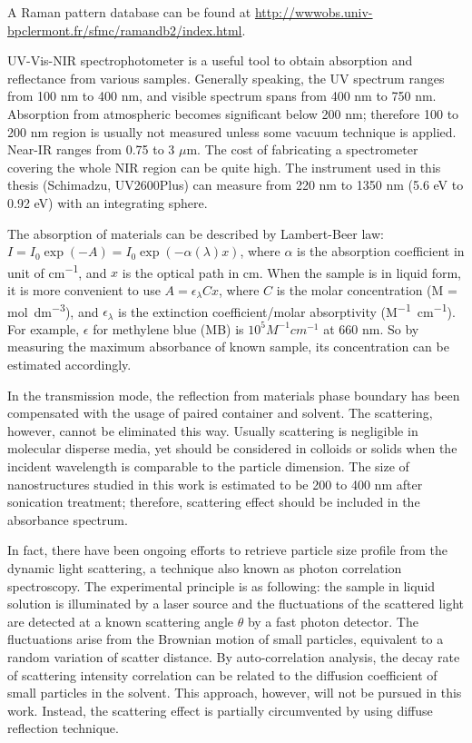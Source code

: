 A Raman pattern database can be found at \url{http://wwwobs.univ-bpclermont.fr/sfmc/ramandb2/index.html}. 

UV-Vis-NIR spectrophotometer is a useful tool to obtain absorption and reflectance from various samples. Generally speaking, the UV spectrum ranges from 100 nm to 400 nm, and visible spectrum spans from 400 nm to 750 nm. Absorption from atmospheric  becomes significant below 200 nm; therefore 100 to 200 nm region is usually not measured unless some vacuum technique is applied. Near-IR ranges from 0.75 to 3 $\mu$m. The cost of fabricating a spectrometer covering the whole NIR region can be quite high. The instrument used in this thesis (Schimadzu, UV2600Plus) can measure from 220 nm to 1350 nm (5.6 eV to 0.92 eV) with an integrating sphere.

The absorption of materials can be described by Lambert-Beer law: $I = I_0 \exp(-A)=I_0\exp(-\alpha(\lambda) x)$, where $\alpha$ is the absorption coefficient in unit of \si{cm^{-1}}, and $x$ is the optical path in cm. When the sample is in liquid form, it is more convenient to use $A =\epsilon_\lambda C x$, where $C$ is the molar concentration (M = \si{\mole dm^{-3}}), and $\epsilon_\lambda$ is the extinction coefficient/molar absorptivity (\si{M^{-1} cm^{-1}}). For example, $\epsilon$ for methylene blue (MB) is $10^5 M^{-1}cm^{-1}$ at 660 nm.\cite{Mills1999} So by measuring the maximum absorbance of known sample, its concentration can be estimated accordingly. 

In the transmission mode, the reflection from materials phase boundary has been compensated with the usage of paired container and solvent. The scattering, however, cannot be eliminated this way. Usually scattering is negligible in molecular disperse media, yet should be considered in colloids or solids when the incident wavelength is comparable to the particle dimension. The size of nanostructures studied in this work is estimated to be 200 to 400 nm after sonication treatment; therefore, scattering effect should be included in the absorbance spectrum. 

In fact, there have been ongoing efforts to retrieve particle size profile from the dynamic light scattering, a technique also known as photon correlation spectroscopy. The experimental principle is as following: the sample in liquid solution is illuminated by a laser source and the fluctuations of the scattered light are detected at a known scattering angle $\theta$ by a fast photon detector. The fluctuations arise from the Brownian motion of small particles, equivalent to a random variation of scatter distance. By auto-correlation analysis, the decay rate of scattering intensity correlation can be related to the diffusion coefficient of small particles in the solvent.\cite{Maret1987} This approach, however, will not be pursued in this work. Instead, the scattering effect is partially circumvented by using diffuse reflection technique. 

